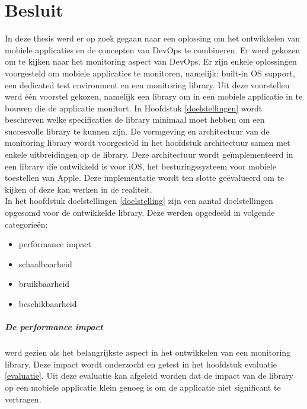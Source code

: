 \chapter{Besluit}
\label{besluit}


In deze thesis werd er op zoek gegaan naar een oplossing om het ontwikkelen van mobiele applicaties en de concepten van DevOps te combineren. Er werd gekozen om te kijken naar het monitoring aspect van DevOps. Er zijn enkele oplossingen voorgesteld om mobiele applicaties te monitoren, namelijk: built-in OS support, een dedicated test environment en een monitoring library. Uit deze voorstellen werd \'e\'en voorstel gekozen, namelijk een library om in een mobiele applicatie in te bouwen die de applicatie monitort. In Hoofdstuk \ref{doelstellingen} wordt beschreven welke specificaties de library minimaal moet hebben om een succesvolle library te kunnen zijn. De vormgeving en architectuur van de monitoring library wordt voorgesteld in het hoofdstuk architectuur samen met enkele uitbreidingen op de library. Deze architectuur wordt ge\"implementeerd in een library die ontwikkeld is voor iOS, het besturingssysteem voor mobiele toestellen van Apple. Deze implementatie wordt ten slotte ge\"evalueerd om te kijken of deze kan werken in de realiteit. \\


In het hoofdstuk doelstellingen \ref{doelstelling} zijn een aantal doelstellingen opgesomd voor de ontwikkelde library. Deze werden opgedeeld in volgende categorie\"en: 
\begin{itemize}
\item performance impact
\item schaalbaarheid
\item bruikbaarheid
\item beschikbaarheid
\end{itemize}

\paragraph{De performance impact} werd gezien als het belangrijkste aspect in het ontwikkelen van een monitoring library. Deze impact wordt onderzocht en getest in het hoofdstuk evaluatie \ref{evaluatie}. Uit deze evaluatie kan afgeleid worden dat de impact van de library op een mobiele applicatie klein genoeg is om de applicatie niet significant te vertragen. \\


